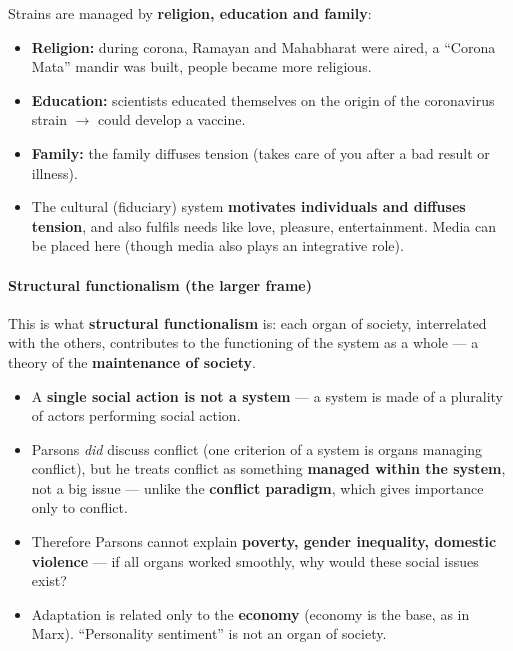 Strains are managed by \textbf{religion, education and family}:

\begin{ExampleBox}
\begin{itemize}
\item \textbf{Religion:} during corona, Ramayan and Mahabharat were aired, a ``Corona Mata'' mandir was built, people became more religious.
\item \textbf{Education:} scientists educated themselves on the origin of the coronavirus strain $\rightarrow$ could develop a vaccine.
\item \textbf{Family:} the family diffuses tension (takes care of you after a bad result or illness).
\end{itemize}
\end{ExampleBox}

\begin{KeyConcept}
\begin{itemize}
\item The cultural (fiduciary) system \textbf{motivates individuals and diffuses tension}, and also fulfils needs like love, pleasure, entertainment. Media can be placed here (though media also plays an integrative role).
\end{itemize}
\end{KeyConcept}

\paragraph{Structural functionalism (the larger frame)}
This is what \textbf{structural functionalism} is: each organ of society, interrelated with the others, contributes to the functioning of the system as a whole --- a theory of the \textbf{maintenance of society}.

\begin{CriticalPoint}
\begin{itemize}
\item A \textbf{single social action is not a system} --- a system is made of a plurality of actors performing social action.
\item Parsons \textit{did} discuss conflict (one criterion of a system is organs managing conflict), but he treats conflict as something \textbf{managed within the system}, not a big issue --- unlike the \textbf{conflict paradigm}, which gives importance only to conflict.
\item Therefore Parsons cannot explain \textbf{poverty, gender inequality, domestic violence} --- if all organs worked smoothly, why would these social issues exist?
\item Adaptation is related only to the \textbf{economy} (economy is the base, as in Marx). ``Personality sentiment'' is not an organ of society.
\end{itemize}
\end{CriticalPoint}

